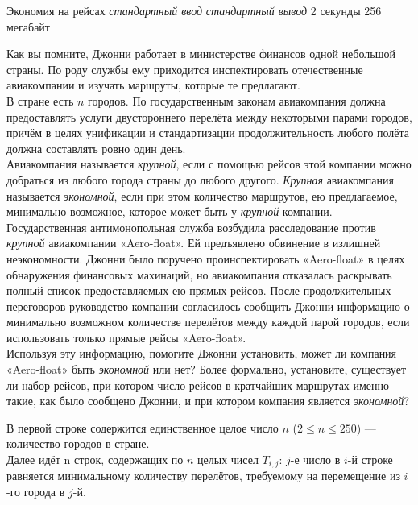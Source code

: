 \begin{problem}%
{Экономия на рейсах}%
{\textsl{стандартный ввод}}%
{\textsl{стандартный вывод}}%
{2 секунды}%
{256 мегабайт}{}

Как вы помните, Джонни работает в министерстве финансов одной небольшой страны. По роду службы ему приходится инспектировать отечественные авиакомпании и изучать маршруты, которые те предлагают.\\

В стране есть $n$ городов. По государственным законам авиакомпания должна предоставлять услуги двустороннего перелёта между некоторыми парами городов, причём в целях унификации и стандартизации продолжительность любого полёта должна составлять ровно один день.\\

Авиакомпания называется \textit{крупной}, если с помощью рейсов этой компании можно добраться из любого города страны до любого другого. \textit{Крупная} авиакомпания называется \textit{экономной}, если при этом количество маршрутов, ею предлагаемое, минимально возможное, которое может быть у \textit{крупной} компании.\\

Государственная антимонопольная служба возбудила расследование против \textit{крупной} авиакомпании «Aero-float». Ей предъявлено обвинение в излишней неэкономности. Джонни было поручено проинспектировать «Aero-float» в целях обнаружения финансовых махинаций, но авиакомпания отказалась раскрывать полный список предоставляемых ею прямых рейсов. После продолжительных переговоров руководство компании согласилось сообщить Джонни информацию о минимально возможном количестве перелётов между каждой парой городов, если использовать только прямые рейсы «Aero-float».\\

Используя эту информацию, помогите Джонни установить, может ли компания «Aero-float» быть \textit{экономной} или нет? Более формально, установите, существует ли набор рейсов, при котором число рейсов в кратчайших маршрутах именно такие, как было сообщено Джонни, и при котором компания является \textit{экономной}?

\InputFile

В первой строке содержится единственное целое число $n$ ($2 \le n \le 250$) — количество городов в стране.\\

Далее идёт n строк, содержащих по $n$ целых чисел $T_{i,j}$: $j$-е число в $i$-й строке равняется минимальному количеству перелётов, требуемому на перемещение из $i$-го города в $j$-й.\\


\end{problem}
